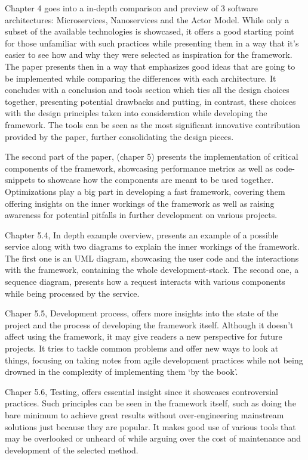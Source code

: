 Chapter 4 goes into a in-depth comparison and preview of 3 software architectures: Microservices, Nanoservices and the Actor Model. While only a subset of the available technologies is showcased, it offers a good starting point for those unfamiliar with such practices while presenting them in a way that it’s easier to see how and why they were selected as inspiration for the framework. The paper presents then in a way that emphasizes good ideas that are going to be implemented while comparing the differences with each architecture. It concludes with a conclusion and tools section which ties all the design choices together, presenting potential drawbacks and putting, in contrast, these choices with the design principles taken into consideration while developing the framework. The tools can be seen as the most significant innovative contribution provided by the paper, further consolidating the design pieces.

The second part of the paper, (chaper 5) presents the implementation of critical components of the framework, showcasing performance metrics as well as code-snippets to showcase how the components are meant to be used together. Optimizations play a big part in developing a fast framework, covering them offering insights on the inner workings of the framework as well as raising awareness for potential pitfalls in further development on various projects. 

Chapter 5.4, In depth example overview, presents an example of a possible service along with two diagrams to explain the inner workings of the framework. The first one is an UML diagram, showcasing the user code and the interactions with the framework, containing the whole development-stack. The second one, a sequence diagram, presents how a request interacts with various components while being processed by the service.


Chaper 5.5, Development process, offers more insights into the state of the project and the process of developing the framework itself. Although it doesn’t affect using the framework, it may give readers a new perspective for future projects. It tries to tackle common problems and offer new ways to look at things, focusing on taking notes from agile development practices while not being drowned in the complexity of implementing them ‘by the book’.

Chaper 5.6, Testing, offers essential insight since it showcases controversial practices. Such principles can be seen in the framework itself, such as doing the bare minimum to achieve great results without over-engineering mainstream solutions just because they are popular. It makes good use of various tools that may be overlooked or unheard of while arguing over the cost of maintenance and development of the selected method.
